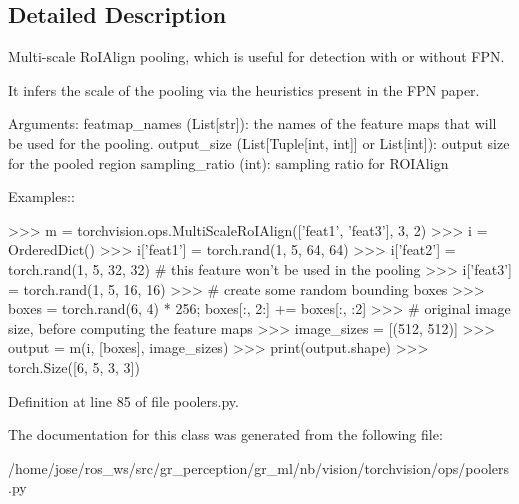 \subsection{Detailed Description}
\begin{DoxyVerb}Multi-scale RoIAlign pooling, which is useful for detection with or without FPN.

It infers the scale of the pooling via the heuristics present in the FPN paper.

Arguments:
    featmap_names (List[str]): the names of the feature maps that will be used
        for the pooling.
    output_size (List[Tuple[int, int]] or List[int]): output size for the pooled region
    sampling_ratio (int): sampling ratio for ROIAlign

Examples::

    >>> m = torchvision.ops.MultiScaleRoIAlign(['feat1', 'feat3'], 3, 2)
    >>> i = OrderedDict()
    >>> i['feat1'] = torch.rand(1, 5, 64, 64)
    >>> i['feat2'] = torch.rand(1, 5, 32, 32)  # this feature won't be used in the pooling
    >>> i['feat3'] = torch.rand(1, 5, 16, 16)
    >>> # create some random bounding boxes
    >>> boxes = torch.rand(6, 4) * 256; boxes[:, 2:] += boxes[:, :2]
    >>> # original image size, before computing the feature maps
    >>> image_sizes = [(512, 512)]
    >>> output = m(i, [boxes], image_sizes)
    >>> print(output.shape)
    >>> torch.Size([6, 5, 3, 3])\end{DoxyVerb}
 

Definition at line 85 of file poolers.\+py.



The documentation for this class was generated from the following file\+:\begin{DoxyCompactItemize}
\item 
/home/jose/ros\+\_\+ws/src/gr\+\_\+perception/gr\+\_\+ml/nb/vision/torchvision/ops/poolers.\+py\end{DoxyCompactItemize}

